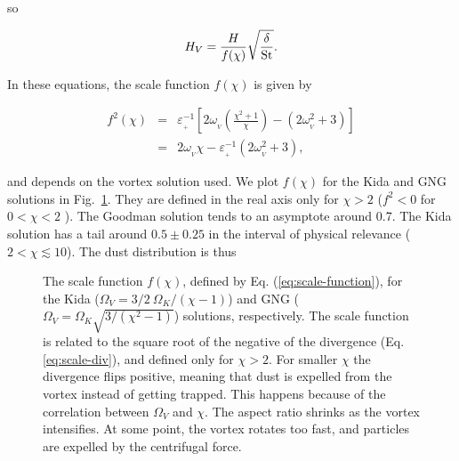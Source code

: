 \documentclass[apj]{emulateapj}
\newcommand{\Eq}[1]{Eq. (\ref{#1})}
\newcommand{\eq}[1]{\Eq{#1}}
\newcommand{\eqp}[1]{(Eq. \ref{#1})}
\newcommand{\Fig}[1]{Fig.~\ref{#1}}
\newcommand{\fig}[1]{\Fig{#1}}
\newcommand{\beq}{\begin{equation}}
\newcommand{\eeq}{\end{equation}}
\newcommand{\beqn}{\begin{eqnarray}}
\newcommand{\eeqn}{\end{eqnarray}}
\newcommand{\epsp}{\varepsilon_{_{+}}}
\newcommand{\St}{{\rm St}}
\begin{document}
\noindent so

\beq
 H_V = \frac{H}{f(\chi)} \sqrt{\frac{\delta}\St}. 
\label{eq:hv}
\eeq


\noindent In these equations, the scale function $f(\chi)$ is given by 

\beqn
f^2(\chi) &=& \epsp^{-1} \left[2\omega_{_V}\left(\frac{\chi^2+1}{\chi}\right) - (2\omega_{_V}^2 + 3) \right]\nonumber \\
          &=& 2\omega_{_V}\chi - \epsp^{-1}(2\omega_{_V}^2 + 3),
\label{eq:scale-function}
\eeqn

\noindent and depends on the vortex solution
used. We plot $f(\chi)$ for the Kida and GNG solutions in
\fig{fig:scale-function}. They are defined in the real axis only for $\chi > 2$ ($f^2
< 0$ for $0 < \chi < 2$ ). The Goodman solution tends to an asymptote
around 0.7. The Kida solution has a  tail around $0.5\pm0.25$ in the
interval of physical relevance ($2 < \chi \lesssim 10$). The dust distribution is thus 

\begin{figure}
  \begin{center}
  \end{center}
\caption[]{The scale function $f(\chi)$, defined by
  \eq{eq:scale-function}, for the Kida ($\varOmega_V=3/2
  \ \varOmega_K/(\chi-1)$) and GNG ($\varOmega_V=\varOmega_K
  \sqrt{3/(\chi^2-1)}$) solutions, respectively. The scale function is
  related to the square root of the negative of the divergence
  \eqp{eq:scale-div}, and defined only for $\chi>2$. For smaller $\chi$ the
  divergence flips positive, meaning that dust is expelled from the
  vortex instead of getting trapped. This happens because of the
  correlation between $\varOmega_V$ and $\chi$. The aspect ratio shrinks
  as the vortex intensifies. At some point, the vortex rotates too
  fast, and particles are expelled by the centrifugal force.}
 \label{fig:scale-function}
\end{figure}
\end{document}
